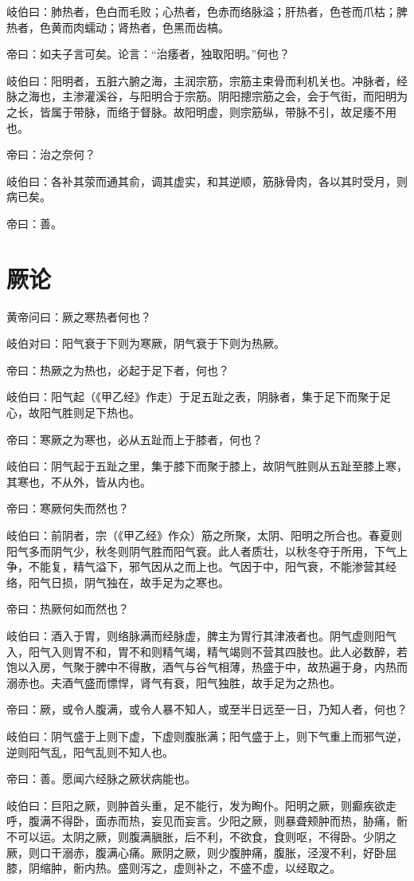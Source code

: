\documentclass{article}%
\begin{document}
岐伯曰：肺热者，色白而毛败；心热者，色赤而络脉溢；肝热者，色苍而爪枯；脾热者，色黄而肉蠕动；肾热者，色黑而齿槁。

帝曰：如夫子言可矣。论言：“治痿者，独取阳明。”何也？

岐伯曰：阳明者，五脏六腑之海，主润宗筋，宗筋主束骨而利机关也。冲脉者，经脉之海也，主渗灌溪谷，与阳明合于宗筋。阴阳摠宗筋之会，会于气街，而阳明为之长，皆属于带脉，而络于督脉。故阳明虚，则宗筋纵，带脉不引，故足痿不用也。

帝曰：治之奈何？

岐伯曰：各补其荥而通其俞，调其虚实，和其逆顺，筋脉骨肉，各以其时受月，则病已矣。

帝曰：善。
\section{厥论}
黄帝问曰：厥之寒热者何也？

岐伯对曰：阳气衰于下则为寒厥，阴气衰于下则为热厥。

帝曰：热厥之为热也，必起于足下者，何也？

岐伯曰：阳气起（《甲乙经》作走）于足五趾之表，阴脉者，集于足下而聚于足心，故阳气胜则足下热也。

帝曰：寒厥之为寒也，必从五趾而上于膝者，何也？

岐伯曰：阴气起于五趾之里，集于膝下而聚于膝上，故阴气胜则从五趾至膝上寒，其寒也，不从外，皆从内也。

帝曰：寒厥何失而然也？

岐伯曰：前阴者，宗（《甲乙经》作众）筋之所聚，太阴、阳明之所合也。春夏则阳气多而阴气少，秋冬则阴气胜而阳气衰。此人者质壮，以秋冬夺于所用，下气上争，不能复，精气溢下，邪气因从之而上也。气因于中，阳气衰，不能渗营其经络，阳气日损，阴气独在，故手足为之寒也。

帝曰：热厥何如而然也？

岐伯曰：酒入于胃，则络脉满而经脉虚，脾主为胃行其津液者也。阴气虚则阳气入，阳气入则胃不和，胃不和则精气竭，精气竭则不营其四肢也。此人必数醉，若饱以入房，气聚于脾中不得散，酒气与谷气相薄，热盛于中，故热遍于身，内热而溺赤也。夫酒气盛而慓悍，肾气有衰，阳气独胜，故手足为之热也。

帝曰：厥，或令人腹满，或令人暴不知人，或至半日远至一日，乃知人者，何也？

岐伯曰：阴气盛于上则下虚，下虚则腹胀满；阳气盛于上，则下气重上而邪气逆，逆则阳气乱，阳气乱则不知人也。

帝曰：善。愿闻六经脉之厥状病能也。

岐伯曰：巨阳之厥，则肿首头重，足不能行，发为眴仆。阳明之厥，则癫疾欲走呼，腹满不得卧，面赤而热，妄见而妄言。少阳之厥，则暴聋颊肿而热，胁痛，䯒不可以运。太阴之厥，则腹满䐜胀，后不利，不欲食，食则呕，不得卧。少阴之厥，则口干溺赤，腹满心痛。厥阴之厥，则少腹肿痛，腹胀，泾溲不利，好卧屈膝，阴缩肿，䯒内热。盛则泻之，虚则补之，不盛不虚，以经取之。
\end{document}
